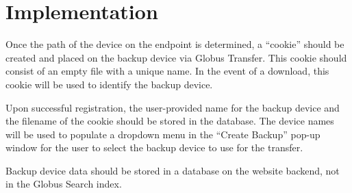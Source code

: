 \section{Implementation}

\noindent Once the path of the device on the endpoint is determined, a ``cookie'' 
should be created and placed on the backup device via Globus Transfer. This cookie 
should consist of an empty file with a unique name. In the event of a download, this 
cookie will be used to identify the backup device.

Upon successful registration, the user-provided name for the backup device and the 
filename of the cookie should be stored in the database. The device names will be 
used to populate a dropdown menu in the ``Create Backup'' pop-up window for the
user to select the backup device to use for the transfer.

Backup device data should be stored in a database on the website backend, not in
the Globus Search index.

